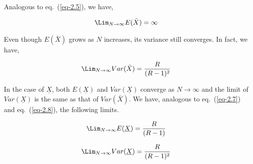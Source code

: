 \begin{multicols}{2}
Analogous to eq.~(\ref{eq-2.5}), we have,

\begin{thm} \label{thm-4.1}
\begin{equation*}
\Lim_{N \rightarrow \infty} E(\bar{X}) = \infty
\end{equation*}
\end{thm}
Even though $E(\bar{X})$ grows as $N$ increases, its variance still converges. In fact, we have,\\ 
 \begin{thm}\label{thm-4.2}
\begin{equation*}
\Lim_{N \rightarrow \infty} Var(\bar{X}) = \frac{R}{(R-1)^2}
\end{equation*}
 \end{thm}

\vspace{-.2cm} 
 
In the case of $\underline{X} $, both $E(\underline{X})$ and $Var(\underline{X})$ converge as $N \rightarrow \infty$ and the limit of $Var(\underline{X})$ is the same as that of $Var(\bar{X})$. We have, analogous to eq.~(\ref{eq-2.7}) and eq.~(\ref{eq-2.8}), the following limits.
\begin{thm}
 \label{thm-4.3}
\begin{equation}\nonumber
\Lim_{N \rightarrow \infty} E(\underline{X}) = \frac{R}{(R-1)}
\end{equation}
 \end{thm}
 \begin{thm}\label{thm-4.4}
\begin{equation}\nonumber
\Lim_{N \rightarrow \infty} Var(\underline{X}) = \frac{R}{(R-1)^2}
\end{equation}
 \end{thm}
 
 \vspace{-.3cm}
 

\end{multicols}
